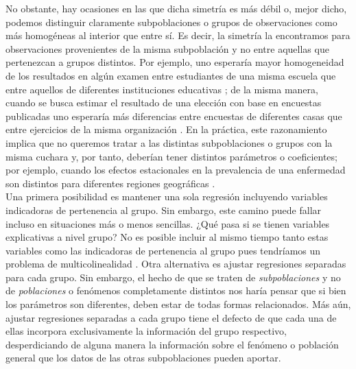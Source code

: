 No obstante, hay ocasiones en las que dicha simetría es más débil o, mejor dicho, podemos distinguir claramente subpoblaciones o grupos de observaciones como más homogéneas al interior que entre sí. Es decir, la simetría la encontramos para observaciones provenientes de la misma subpoblación y no entre aquellas que pertenezcan a grupos distintos. Por ejemplo, uno esperaría mayor homogeneidad de los resultados en algún examen entre estudiantes de una misma escuela que entre aquellos de diferentes instituciones educativas \parencite{Ortiz12}; de la misma manera, cuando se busca estimar el resultado de una elección con base en encuestas publicadas uno esperaría más diferencias entre encuestas de diferentes casas que entre ejercicios de la misma organización \parencite{Zepeda18}. En la práctica, este razonamiento implica que no queremos tratar a las distintas subpoblaciones o grupos con la misma cuchara y, por tanto, deberían tener distintos parámetros o coeficientes; por ejemplo, cuando los efectos estacionales en la prevalencia de una enfermedad son distintos para diferentes regiones geográficas \parencite{Usi14}.\\ 

Una primera posibilidad es mantener una sola regresión incluyendo variables indicadoras de pertenencia al grupo. Sin embargo, este camino puede fallar incluso en situaciones más o menos sencillas. ¿Qué pasa si se tienen variables explicativas a nivel grupo? No es posible incluir al mismo tiempo tanto estas variables como las indicadoras de pertenencia al grupo pues tendríamos un problema de multicolinealidad \parencite[7]{GelmanHill06}. Otra alternativa es ajustar regresiones separadas para cada grupo. Sin embargo, el hecho de que se traten de \textit{subpoblaciones} y no de \textit{poblaciones} o fenómenos completamente distintos nos haría pensar que si bien los parámetros son diferentes, deben estar de todas formas relacionados. Más aún, ajustar regresiones separadas a cada grupo tiene el defecto de que cada una de ellas incorpora exclusivamente la información del grupo respectivo, desperdiciando de alguna manera la información sobre el fenómeno o población general que los datos de las otras subpoblaciones pueden aportar.\\


